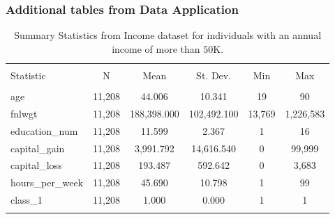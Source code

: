 \subsubsection{Additional tables from Data Application}
\label{app:data-tables}

\begin{table}[H] \centering 
\begin{tabular}{@{\extracolsep{5pt}}lccccc} 
\\[-1.8ex]\hline 
\hline \\[-1.8ex] 
Statistic & \multicolumn{1}{c}{N} & \multicolumn{1}{c}{Mean} & \multicolumn{1}{c}{St. Dev.} & \multicolumn{1}{c}{Min} & \multicolumn{1}{c}{Max} \\ 
\hline \\[-1.8ex] 
age & 11,208 & 44.006 & 10.341 & 19 & 90 \\ 
fnlwgt & 11,208 & 188,398.000 & 102,492.100 & 13,769 & 1,226,583 \\ 
education\_num & 11,208 & 11.599 & 2.367 & 1 & 16 \\ 
capital\_gain & 11,208 & 3,991.792 & 14,616.540 & 0 & 99,999 \\ 
capital\_loss & 11,208 & 193.487 & 592.642 & 0 & 3,683 \\ 
hours\_per\_week & 11,208 & 45.690 & 10.798 & 1 & 99 \\ 
class\_1 & 11,208 & 1.000 & 0.000 & 1 & 1 \\ 
\hline \\[-1.8ex] 
\end{tabular} 
\caption[Data application - Summary statistics for individuals with an annual income of more than $50$K]{Summary Statistics from Income dataset for individuals with an annual income of more than $50$K.} 
\label{tab:data-summary2} 
\end{table}

